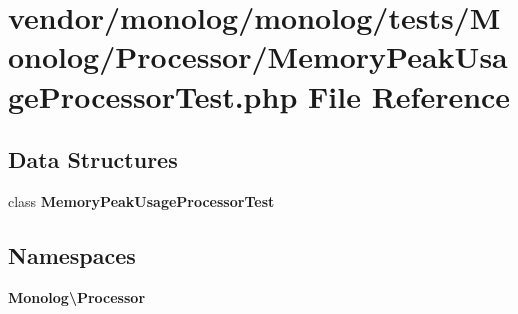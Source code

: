 \section{vendor/monolog/monolog/tests/\+Monolog/\+Processor/\+Memory\+Peak\+Usage\+Processor\+Test.php File Reference}
\label{_memory_peak_usage_processor_test_8php}
\subsection*{Data Structures}
\begin{DoxyCompactItemize}
\item 
class {\bf Memory\+Peak\+Usage\+Processor\+Test}
\end{DoxyCompactItemize}
\subsection*{Namespaces}
\begin{DoxyCompactItemize}
\item 
 {\bf Monolog\textbackslash{}\+Processor}
\end{DoxyCompactItemize}
